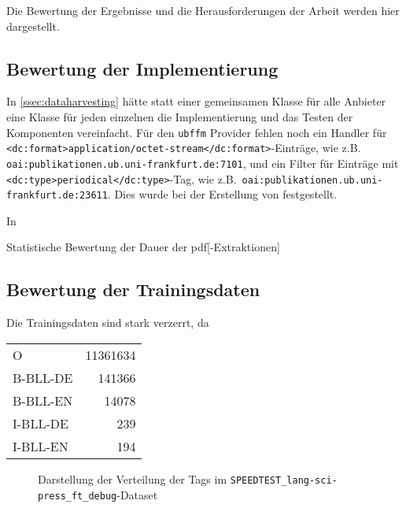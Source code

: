 Die Bewertung der Ergebnisse und die Herausforderungen der Arbeit
werden hier dargestellt.

\subsection{Bewertung der Implementierung}
\label{ssec:discussion:implementation}
In \cref{ssec:dataharvesting}
hätte statt einer gemeinsamen Klasse
für alle Anbieter
eine Klasse für jeden einzelnen die Implementierung
und das Testen der Komponenten vereinfacht.
Für den \texttt{ubffm} Provider fehlen noch ein
Handler für \texttt{<dc:format>application/octet-stream</dc:format>}-Einträge,
wie z.B.\, \texttt{oai:publikationen.ub.uni-frankfurt.de:7101},
und ein Filter für Einträge mit \texttt{<dc:type>periodical</dc:type>}-Tag,
wie z.B.\, \texttt{oai:publikationen.ub.uni-frankfurt.de:23611}.
Dies wurde bei der Erstellung von  festgestellt.

In 


\begin{table}
	\centering
	
	\caption{Statistische Bewertung der Dauer der \gls{pdf}[-Extraktionen]}
	\label{tbl:pdf_extraction:duration}
\end{table}

\subsection{Bewertung der Trainingsdaten}

Die Trainingsdaten sind stark verzerrt,
da 
\begin{table}
	\begin{tabularx}{\textwidth}{lr}
		O        & 11361634 \\
		B-BLL-DE & 141366   \\
		B-BLL-EN & 14078    \\
		I-BLL-DE & 239      \\
		I-BLL-EN & 194
	\end{tabularx}
\end{table}


\begin{figure}
	\begin{adjustbox}{center,max width=0.9\linewidth,max totalheight=0.9\textheight}
		\begin{tcolorbox}
			
		\end{tcolorbox}
	\end{adjustbox}
	\caption{Darstellung der Verteilung der Tags im \texttt{SPEEDTEST\_lang-sci-press\_ft\_debug}-Dataset}
\end{figure}

